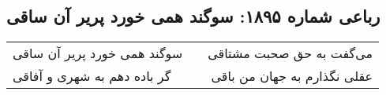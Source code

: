 \begin{center}
\section*{رباعی شماره ۱۸۹۵: سوگند همی خورد پریر آن ساقی}
\label{sec:1895}
\begin{longtable}{l p{0.5cm} r}
سوگند همی خورد پریر آن ساقی
&&
می‌گفت به حق صحبت مشتاقی
\\
گر باده دهم به شهری و آفاقی
&&
عقلی نگذارم به جهان من باقی
\\
\end{longtable}
\end{center}
